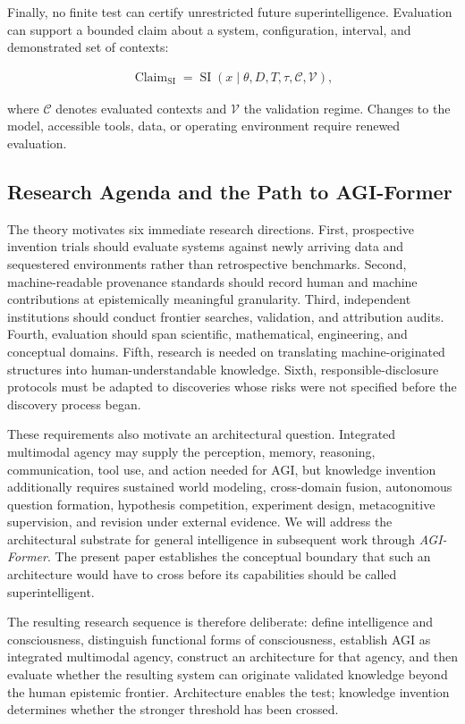 Finally, no finite test can certify unrestricted future superintelligence.
Evaluation can support a bounded claim about a system, configuration, interval,
and demonstrated set of contexts:

\begin{equation}
\begin{aligned}
\operatorname{Claim}_{\mathrm{SI}}
=\operatorname{SI}(x\mid
\theta,D,T,\tau,\mathcal{C},\mathcal{V}),
\end{aligned}
\label{eq:bounded_si_claim}
\end{equation}

where $\mathcal{C}$ denotes evaluated contexts and $\mathcal{V}$ the validation
regime. Changes to the model, accessible tools, data, or operating environment
require renewed evaluation.

\subsection{\textbf{Research Agenda and the Path to AGI-Former}}

The theory motivates six immediate research directions. First, prospective
invention trials should evaluate systems against newly arriving data and
sequestered environments rather than retrospective benchmarks. Second,
machine-readable provenance standards should record human and machine
contributions at epistemically meaningful granularity. Third, independent
institutions should conduct frontier searches, validation, and attribution
audits. Fourth, evaluation should span scientific, mathematical, engineering,
and conceptual domains. Fifth, research is needed on translating
machine-originated structures into human-understandable knowledge. Sixth,
responsible-disclosure protocols must be adapted to discoveries whose risks
were not specified before the discovery process began.

These requirements also motivate an architectural question. Integrated
multimodal agency may supply the perception, memory, reasoning, communication,
tool use, and action needed for AGI, but knowledge invention additionally
requires sustained world modeling, cross-domain fusion, autonomous question
formation, hypothesis competition, experiment design, metacognitive
supervision, and revision under external evidence. We will address the
architectural substrate for general intelligence in subsequent work through
\emph{AGI-Former}. The present paper establishes the conceptual boundary that
such an architecture would have to cross before its capabilities should be
called superintelligent.

The resulting research sequence is therefore deliberate: define intelligence
and consciousness, distinguish functional forms of consciousness, establish
AGI as integrated multimodal agency, construct an architecture for that agency,
and then evaluate whether the resulting system can originate validated
knowledge beyond the human epistemic frontier. Architecture enables the test;
knowledge invention determines whether the stronger threshold has been crossed.
